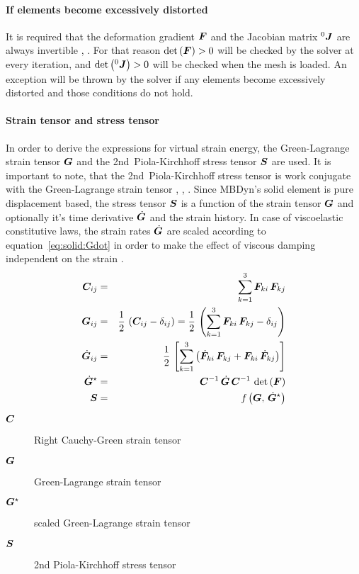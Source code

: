 \paragraph{If elements become excessively distorted}
It is required that the deformation gradient $\bm{F}$ and the Jacobian matrix ${^0}\bm{J}$ are always invertible \cite{BATHE2016}, \cite{KUEBLER2005}.
For that reason $\det{\left(\bm{F}\right)}>0$ will be checked by the solver at every iteration, and $\det{\left({^0}\bm{J}\right)}>0$ will be checked
when the mesh is loaded. An exception will be thrown by the solver if any elements become excessively distorted and those conditions do not hold.

\paragraph{Strain tensor and stress tensor}
In order to derive the expressions for virtual strain energy, the Green-Lagrange strain tensor $\bm{G}$ and the 2nd~Piola-Kirchhoff stress tensor $\bm{S}$ are used.
It is important to note, that the 2nd~Piola-Kirchhoff stress tensor is work conjugate with the Green-Lagrange strain tensor \cite{WALLRAPP1998}, \cite{BATHE2016}, \cite{KUEBLER2005}.
Since MBDyn's solid element is pure displacement based, the stress tensor $\bm{S}$ is a function of the strain tensor $\bm{G}$ and optionally it's time derivative $\dot{\bm{G}}$ and the strain history.
In case of viscoelastic constitutive laws, the strain rates $\dot{\bm{G}}$ are scaled according to equation~\ref{eq:solid:Gdot} in order to make the effect of viscous damping independent on the strain \cite{KUEBLER2005}.
\begin{eqnarray}
\bm{C}_{ij} & = & \sum_{k=1}^3\bm{F}_{ki}\,\bm{F}_{kj} \\
\bm{G}_{ij} & = & \frac{1}{2} \, \left(\bm{C}_{ij} - \delta_{ij} \right) = \frac{1}{2} \, \left(\sum_{k=1}^3\bm{F}_{ki}\,\bm{F}_{kj} - \delta_{ij}\right) \label{eq:solid:G} \\
\dot{\bm{G}}_{ij} & = & \frac{1}{2} \, \left[\sum_{k=1}^3\left(\dot{\bm{F}}_{ki}\,\bm{F}_{kj} + \bm{F}_{ki}\,\dot{\bm{F}}_{kj} \right)\right] \\
\dot{\bm{G}}^{\star} & = & \bm{C}^{-1} \, \dot{\bm{G}} \, \bm{C}^{-1} \, \det{\left(\bm{F}\right)} \label{eq:solid:Gdot} \\
\bm{S} & = & \mathit{f}\left(\bm{G}, \, \dot{\bm{G}}^{\star}\right)
\end{eqnarray}

\begin{description}
\item[$\bm{C}$] Right Cauchy-Green strain tensor
\item[$\bm{G}$] Green-Lagrange strain tensor
\item[$\bm{G}^{\star}$] scaled Green-Lagrange strain tensor
\item[$\bm{S}$] 2nd Piola-Kirchhoff stress tensor
\end{description}

